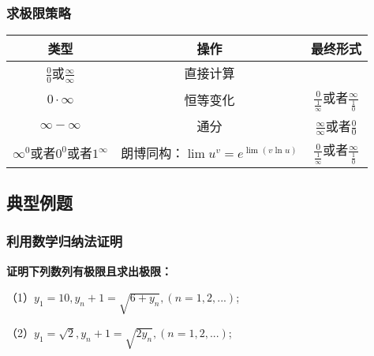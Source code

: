 \documentclass[12pt , a4paper , oneside]{ctexart}
\begin{document}
            \subsubsection{求极限策略}
            \begin{center}
            \begin{tabular}{c|c|c}
                \toprule
                \textbf{类型} & \textbf{操作} & \textbf{最终形式} \\  %
                \midrule
                $\frac{0}{0}$或$\frac{\infty}{\infty}$ & 直接计算 &  \\  %
                \midrule
                $0 \cdot \infty$ & 恒等变化 & $\frac{0}{\frac{1}{\infty}}$或者$\frac{\infty}{\frac{1}{0}}$\\  %
                \midrule
                $\infty - \infty$ & 通分 & $\frac{\infty}{\infty}$或者$\frac{0}{0}$ \\  %
                \midrule
                $\infty ^ 0$或者$0^0$或者$1^\infty$ & 朗博同构：$\lim u^v = e^{\lim(v\ln u)}$ & $\frac{0}{\frac{1}{\infty}}$或者$\frac{\infty}{\frac{1}{0}}$\\
                \bottomrule
            \end{tabular}
            \end{center}

        \subsection{典型例题}
            \subsubsection{利用数学归纳法证明}
            \textbf{证明下列数列有极限且求出极限：}

            （1）$y_1=10,y_n+1 = \sqrt{6+y_n},(n=1,2,...)$;

            （2）$y_1=\sqrt{2},y_n+1 = \sqrt{2 y_n},(n=1,2,...)$;
\end{document}
